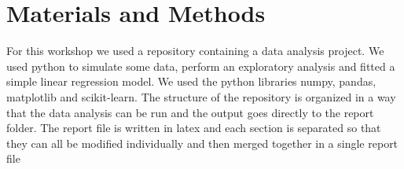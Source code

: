 \section{Materials and Methods}


For this workshop we used a repository containing a data analysis project. We used python to simulate some data, perform an exploratory analysis and fitted a simple linear regression model. We used the python libraries numpy, pandas, matplotlib and scikit-learn. The structure of the repository is organized in a way that the data analysis can be run and the output goes directly to the report folder. The report file is written in latex and each section is separated so that they can all be modified individually and then merged together in a single report file